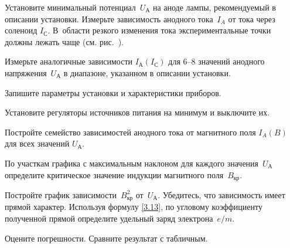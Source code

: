 \begin{lab:task}


    
\item Установите минимальный потенциал~$U_{А}$ на аноде лампы, 
рекомендуемый в описании установки. Измерьте зависимость анодного тока~$I_A$ 
от тока через соленоид $I_{С}$. В~области резкого изменения тока
экспериментальные точки должны лежать чаще 
(см. рис.~).

\item Измерьте аналогичные зависимости $I_{А}(I_{С})$ для 6--8 
значений анодного напряжения~$U_{А}$ в диапазоне, указанном в описании установки.

\item Запишите параметры установки и характеристики приборов. 

\item Установите регуляторы источников питания на минимум и выключите их.


\item Постройте семейство зависимостей анодного тока от магнитного поля $I_{A}(B)$ 
для всех значений $U_{А}$. 

\item По участкам графика с максимальным наклоном для каждого значения~$U_{А}$ 
определите критическое значение индукции магнитного поля~$B_\text{кр}$.

\item Постройте  график зависимости~$B_\text{кр}^2$ от~$U_{А}$. 
Убедитесь, что зависимость имеет прямой характер. Используя
формулу \eqref{3.13}, по угловому коэффициенту полученной 
прямой определите удельный заряд электрона~$e/m$.

\item Оцените погрешности. Сравните результат с табличным.

\end{lab:task}


